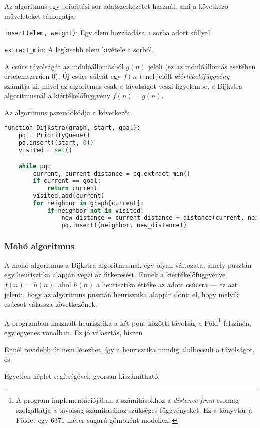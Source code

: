 Az algoritmus egy prioritási sor adatszerkezetet használ, ami a következő műveleteket támogatja:

\begin{compactitem}
    \item \texttt{insert(elem, weight)}: Egy elem hozzáadása a sorba adott súllyal.
    \item \texttt{extract\_min}: A legkisebb elem kivétele a sorból.
\end{compactitem}

A csúcs távolságát az indulóállomásból $g(n)$ jelöli (ez az indulóállomás esetében értelemszerűen $0$). Új csúcs súlyát egy $f(n)$-nel jelölt \textit{kiértékelőfüggvény} számítja ki. mivel az algoritmus csak a távolságot veszi figyelembe, a Dijkstra algoritmusnál a kiértékelőfüggvény $f(n) = g(n)$.

Az algoritmus pszeudokódja a következő:

\begin{lstlisting}[language={Python}]
function Dijkstra(graph, start, goal):
    pq = PriorityQueue()
    pq.insert((start, 0))
    visited = set()

    while pq:
        current, current_distance = pq.extract_min()
        if current == goal:
            return current
        visited.add(current)
        for neighbor in graph[current]:
            if neighbor not in visited:
                new_distance = current_distance + distance(current, neighbor)
                pq.insert((neighbor, new_distance))
\end{lstlisting}

\subsubsection{Mohó algoritmus}

A mohó algoritmus a Dijkstra algoritmusnak egy olyan változata, amely pusztán egy heurisztika alapján végzi az útkeresést\cite{russell2020artificial}. Ennek a kiértékelőfüggvénye $f(n) = h(n)$, ahol $h(n)$ a heurisztika értéke az adott csúcsra --- ez azt jelenti, hogy az algoritmus pusztán heurisztika alapján dönti el, hogy melyik csúcsot válassza következőnek.

A programban használt heurisztika a két pont közötti távolság a Föld\footnote{A program implementációjában a számításokhoz a \textit{distance-from} csomag szolgáltatja a távolság számításához szükséges függvényeket. Ez a könyvtár a Földet egy 6371 méter sugarú gömbként modellezi\cite{distancefrom-github}.} felszínén, egy egyenes vonalban. Ez jó választás\cite{russell2020artificial}, hiszen
\begin{compactenum}
    \item Ennél rövidebb út nem létezhet, így a heurisztika mindig alulbecsüli a távolságot, és
    \item Egyetlen képlet segítségével, gyorsan kiszámítható.
\end{compactenum}

